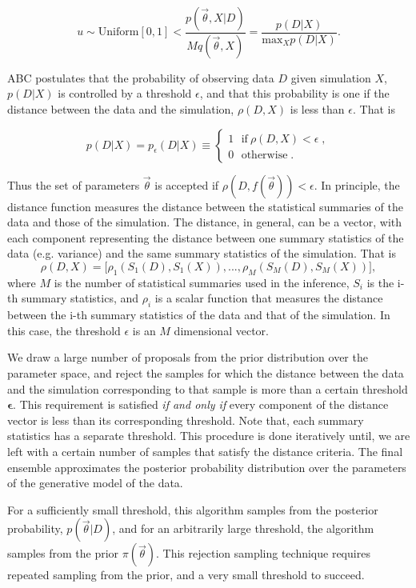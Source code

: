 \documentclass[12pt, preprint]{aastex}
\newcommand{\beq}{\begin{equation}}
\newcommand{\eeq}{\end{equation}}
\newcommand{\pars}{\vec{\theta}}
\begin{document}
\beq 
u \sim \mathrm{Uniform}[0,1] < \frac{p(\pars,X|D)}{Mq(\pars,X)}=\frac{p(D|X)}{\mathrm{max}_{X}p(D|X)}.
\eeq 

ABC postulates that the probability of observing data $D$ given simulation $X$, $p(D|X)$ is controlled by a threshold $\epsilon$, and that this probability is one if the distance between the data and the simulation, $\rho(D,X)$ is less than $\epsilon$. That is

\beq 
p(D|X) = p_{\epsilon}(D|X) \equiv \begin{cases}
                                    1 \ \ \  \mathrm{if} \ \rho(D,X)<\epsilon \; , \\
                                    0 \ \ \ \mathrm{otherwise} \; .
                                    \end{cases}
\eeq 

Thus the set of parameters $\pars$ is accepted if $\rho(D,f(\pars))<\epsilon$. In principle, the distance function measures the distance 
between the statistical summaries of the data and those of the simulation. 
The distance, in general, can be a vector, with each component representing the distance between one summary statistics of the data (e.g. variance) and the same summary statistics of the simulation. That is
\beq 
\rho(D,X) = \Big[\rho_{1}(S_{1}(D) , S_{1}(X)), ... , \rho_{M}(S_{M}(D) , S_{M}(X)) \Big],
\eeq 
where $M$ is the number of statistical summaries used in the inference, $S_{i}$ is the i-th summary statistics, and $\rho_{i}$ is a scalar function that measures the distance between the i-th summary statistics of the data and that of the simulation. In this case, the threshold $\epsilon$ is an $M$ dimensional vector.

We draw a large number of proposals from the prior distribution over the parameter space, 
and reject the samples for which the distance between the data and the simulation corresponding to that 
sample is more than a certain threshold $\bm{\epsilon}$. This requirement is satisfied \emph{if and only if}
every component of the distance vector is less than its corresponding threshold. Note that, each summary statistics 
has a separate threshold. This procedure is done iteratively until, we are left with a certain number
of samples that satisfy the distance criteria. The final ensemble approximates the posterior probability distribution over the parameters of the generative model of the data.

For a sufficiently small threshold, this algorithm samples from the posterior probability, $p(\pars | D)$, and for an arbitrarily large threshold, the algorithm samples from the prior $\pi(\pars)$. This rejection sampling technique requires repeated sampling from the prior, and a very small threshold to succeed.
\end{document}
